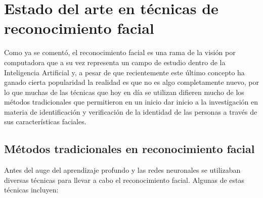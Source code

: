 \section{Estado del arte en técnicas de reconocimiento facial}

Como ya se comentó, el reconocimiento facial es una rama de la visión por computadora que a su vez representa un campo de estudio dentro de la Inteligencia Artificial y, a pesar de que recientemente este último concepto ha ganado cierta popularidad la realidad es que no es algo completamente nuevo, por lo que muchas de las técnicas que hoy en día se utilizan difieren mucho de los métodos tradicionales que permitieron en un inicio dar inicio a la investigación en materia de identificación y verificación de la identidad de las personas a través de sus características faciales.

\subsection{Métodos tradicionales en reconocimiento facial}

Antes del auge del aprendizaje profundo y las redes neuronales se utilizaban diversas técnicas para llevar a cabo el reconocimiento facial.
Algunas de estas técnicas incluyen:

